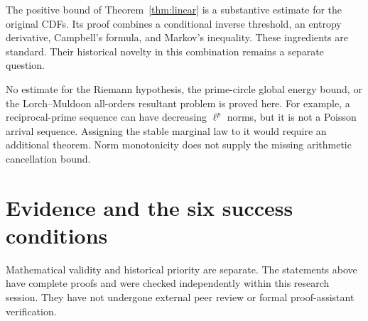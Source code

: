 \documentclass[11pt,a4paper]{article}
\begin{document}
The positive bound of Theorem~\ref{thm:linear} is a substantive
estimate for the original CDFs. Its proof combines a conditional
inverse threshold, an entropy derivative, Campbell's formula, and
Markov's inequality. These ingredients are standard. Their historical
novelty in this combination remains a separate question.

No estimate for the Riemann hypothesis, the prime-circle global
energy bound, or the Lorch--Muldoon all-orders resultant problem is
proved here. For example, a reciprocal-prime sequence can have
decreasing \(\ell^p\) norms, but it is not a Poisson arrival sequence.
Assigning the stable marginal law to it would require an additional
theorem. Norm monotonicity does not supply the missing arithmetic
cancellation bound.

\appendix
\section{Evidence and the six success conditions}
Mathematical validity and historical priority are separate.
The statements above have complete proofs and were checked
independently within this research session. They have not undergone
external peer review or formal proof-assistant verification.
\end{document}
